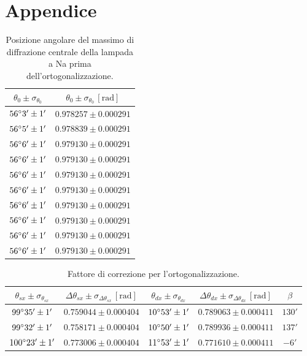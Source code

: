 \documentclass[]{article}
\let\oldsection\section%
\renewcommand{\section}{%
	\renewcommand{\theequation}{\thesection.\arabic{equation}}%
	\oldsection}%
\begin{document}
    \newpage

    \section*{Appendice}

    \begin{table}[H]
        \centering
        \begin{tabular}{||c|c||}
            \hline
            $\theta_0 \pm \sigma_{\theta_0}$ & $\theta_0 \pm \sigma_{\theta_0} \, \left[\text{rad}\right]$ \\\hline
            \hline
            $56\degree 3' \pm 1'$ & $0.978257 \pm 0.000291$ \\\hline
            $56\degree 5' \pm 1'$ & $0.978839 \pm 0.000291$ \\\hline
            $56\degree 6' \pm 1'$ & $0.979130 \pm 0.000291$ \\\hline
            $56\degree 6' \pm 1'$ & $0.979130 \pm 0.000291$ \\\hline
            $56\degree 6' \pm 1'$ & $0.979130 \pm 0.000291$ \\\hline
            $56\degree 6' \pm 1'$ & $0.979130 \pm 0.000291$ \\\hline
            $56\degree 6' \pm 1'$ & $0.979130 \pm 0.000291$ \\\hline
            $56\degree 6' \pm 1'$ & $0.979130 \pm 0.000291$ \\\hline
            $56\degree 6' \pm 1'$ & $0.979130 \pm 0.000291$ \\\hline
            $56\degree 6' \pm 1'$ & $0.979130 \pm 0.000291$ \\\hline
        \end{tabular}
        \caption{Posizione angolare del massimo di diffrazione centrale della lampada a Na prima dell'ortogonalizzazione.}
        \label{prel-max-c}
    \end{table}

    \begin{table}[H]
        \centering
        \begin{tabular}{||c|c|c|c|c||}
            \hline
            $\theta_{sx} \pm \sigma_{\theta_{sx}}$ & $\Delta\theta_{sx} \pm \sigma_{\Delta\theta_{sx}} \, \left[\text{rad}\right]$ & $\theta_{dx} \pm \sigma_{\theta_{dx}}$ & $\Delta\theta_{dx} \pm \sigma_{\Delta\theta_{dx}} \, \left[\text{rad}\right]$ & $\beta$ \\\hline
            \hline
            $99\degree  35' \pm 1'$ & $0.759044 \pm 0.000404$ & $10\degree 53' \pm 1'$ & $0.789063 \pm 0.000411$ & $130'$ \\\hline
            $99\degree  32' \pm 1'$ & $0.758171 \pm 0.000404$ & $10\degree 50' \pm 1'$ & $0.789936 \pm 0.000411$ & $137'$ \\\hline
            $100\degree 23' \pm 1'$ & $0.773006 \pm 0.000404$ & $11\degree 53' \pm 1'$ & $0.771610 \pm 0.000411$ & $ -6'$ \\\hline
        \end{tabular}
        \caption{Fattore di correzione per l'ortogonalizzazione.}
        \label{prel-ort}
    \end{table}
\end{document}

